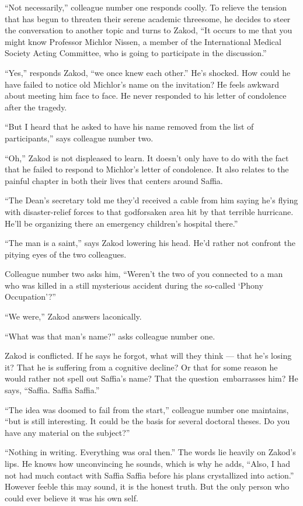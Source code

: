 \documentclass[twoside,11pt,openany]{book}
\begin{document}
``Not necessarily,'' colleague number one responds coolly. To relieve the tension that has
begun to threaten their serene academic threesome, he decides to steer the conversation to another topic and turns to
Zakod, ``It occurs to me that you might know Professor Michlor Nissen, a member of the International
Medical Society Acting Committee, who is going to participate in the discussion.''

``Yes,'' responds Zakod, ``we once knew each other.'' He's shocked.
How could he have failed to notice old Michlor's name on the invitation? He feels awkward about meeting  him face to
face. He never responded to his letter of condolence after the tragedy.

``But I heard that he asked to have his name removed from the list of participants,'' says
colleague number two.

``Oh,'' Zakod is not displeased to learn. It doesn't only have to do with the fact that he
failed to respond to Michlor's letter of condolence. It also relates to the painful chapter in both their lives that
centers around Saffia.

``The Dean's secretary told me they'd received a cable from him saying he's flying with disaster-relief
forces to{ }that godforsaken area hit by that terrible hurricane. He'll be organizing there an
emergency children's hospital there.''

``The man is a saint,'' says Zakod lowering his head. He'd rather not confront the pitying
eyes of the two colleagues.

Colleague number two asks him, ``Weren't the two of you connected to a man who was killed in a still
mysterious accident during the so-called `Phony Occupation'?''

``We were,'' Zakod answers laconically.

``What was that man's name?'' asks colleague number one.

Zakod is conflicted. If he says he forgot, what will they think --- that he's losing it?{ }That he is
suffering from a cognitive decline? Or that for some reason he would rather not spell out Saffia's name? That the
question~embarrasses him? He says, ``Saffia. Saffia Saffia.''

``The idea was doomed to fail from the start,'' colleague number one maintains, ``but is still
interesting. It could be the basis for several doctoral theses. Do you have any material on the subject?''


``Nothing in writing. Everything was oral then.'' The words lie heavily on Zakod's lips. He
knows how unconvincing he sounds, which is why he adds, ``Also, I had not had much contact with Saffia
Saffia before his plans crystallized into action.'' However feeble this may sound, it is the honest truth.
But the only person who could ever believe it was his own self.
\end{document}
